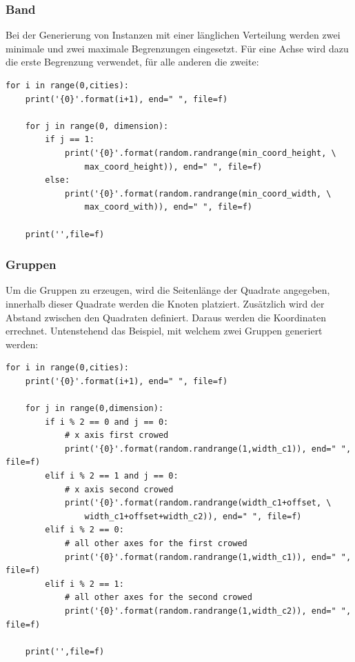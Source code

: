 \documentclass[11pt,a4paper]{article}
\begin{document}
\subsubsection{Band}
Bei der Generierung von Instanzen mit einer länglichen Verteilung werden zwei minimale und zwei maximale Begrenzungen eingesetzt. Für eine Achse wird dazu die erste Begrenzung verwendet, für alle anderen die zweite:

\begin{verbatim}
for i in range(0,cities):
    print('{0}'.format(i+1), end=" ", file=f)

    for j in range(0, dimension):
        if j == 1:
            print('{0}'.format(random.randrange(min_coord_height, \
                max_coord_height)), end=" ", file=f)
        else:
            print('{0}'.format(random.randrange(min_coord_width, \
                max_coord_with)), end=" ", file=f)

    print('',file=f)
\end{verbatim}

\subsubsection{Gruppen}
Um die Gruppen zu erzeugen, wird die Seitenlänge der Quadrate angegeben, innerhalb dieser Quadrate werden die Knoten platziert. Zusätzlich wird der Abstand zwischen den Quadraten definiert. Daraus werden die Koordinaten errechnet. Untenstehend das Beispiel, mit welchem zwei Gruppen generiert werden:

\begin{verbatim}
for i in range(0,cities):
    print('{0}'.format(i+1), end=" ", file=f)

    for j in range(0,dimension):
        if i % 2 == 0 and j == 0:
            # x axis first crowed
            print('{0}'.format(random.randrange(1,width_c1)), end=" ", file=f)
        elif i % 2 == 1 and j == 0:
            # x axis second crowed
            print('{0}'.format(random.randrange(width_c1+offset, \
                width_c1+offset+width_c2)), end=" ", file=f)
        elif i % 2 == 0:
            # all other axes for the first crowed
            print('{0}'.format(random.randrange(1,width_c1)), end=" ", file=f)
        elif i % 2 == 1:
            # all other axes for the second crowed
            print('{0}'.format(random.randrange(1,width_c2)), end=" ", file=f)

    print('',file=f)
\end{verbatim}
\end{document}
